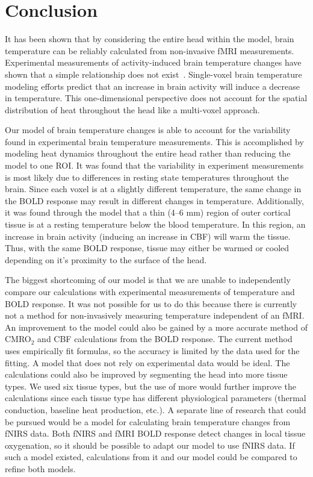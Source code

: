 \chapter{Conclusion}

It has been shown that by considering the entire head within the model, brain temperature can be reliably calculated from non-invasive fMRI measurements. Experimental measurements of activity-induced brain temperature changes have shown that a simple relationship does not exist~\citep{mcelligott,kiyatkin,zeschke,george,tachibana}. Single-voxel brain temperature modeling efforts predict that an increase in brain activity will induce a decrease in temperature. This one-dimensional perspective does not account for the spatial distribution of heat throughout the head like a multi-voxel approach.

Our model of brain temperature changes is able to account for the variability found in experimental brain temperature measurements.  This is accomplished by modeling heat dynamics throughout the entire head rather than reducing the model to one ROI.  It was found that the variability in experiment measurements is most likely due to differences in resting state temperatures throughout the brain.  Since each voxel is at a slightly different temperature, the same change in the BOLD response may result in different changes in temperature. Additionally, it was found through the model that a thin (4--6 mm) region of outer cortical tissue is at a resting temperature below the blood temperature.  In this region, an increase in brain activity (inducing an increase in CBF) will warm the tissue.  Thus, with the same BOLD response, tissue may either be warmed or cooled depending on it's proximity to the surface of the head.

The biggest shortcoming of our model is that we are unable to independently compare our calculations with experimental measurements of temperature and BOLD response. It was not possible for us to do this because there is currently not a method for non-invasively measuring temperature independent of an fMRI. An improvement to the model could also be gained by a more accurate method of CMRO$_2$ and CBF calculations from the BOLD response. The current method uses empirically fit formulas, so the accuracy is limited by the data used for the fitting. A model that does not rely on experimental data would be ideal. The calculations could also be improved by segmenting the head into more tissue types.  We used six tissue types, but the use of more would further improve the calculations since each tissue type has different physiological parameters (thermal conduction, baseline heat production, etc.). A separate line of research that could be pursued would be a model for calculating brain temperature changes from fNIRS data. Both fNIRS and fMRI BOLD response detect changes in local tissue oxygenation, so it should be possible to adapt our model to use fNIRS data. If such a model existed, calculations from it and our model could be compared to refine both models.

